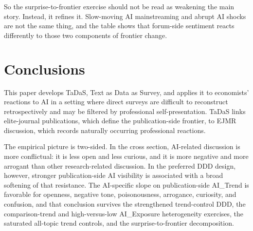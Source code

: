 \documentclass[11pt]{article}
\begin{document}
So the surprise-to-frontier exercise should not be read as weakening the main story. Instead, it refines it. Slow-moving AI mainstreaming and abrupt AI shocks are not the same thing, and the table shows that forum-side sentiment reacts differently to those two components of frontier change.

\begin{table}[!htbp]
    \centering
    \caption{Surprise-to-Frontier Decomposition: Preferred Full Specification}
    \label{tab:surprise_frontier_summary}
    \scriptsize
    \setlength{\tabcolsep}{4pt}
    \renewcommand{\arraystretch}{0.95}
    {\captionsetup{justification=raggedright,singlelinecheck=false}
    \caption*{\footnotesize Notes: Significance is based on year-clustered standard errors. * \(p<0.1\), ** \(p<0.05\), *** \(p<0.01\).}}
\end{table}

\FloatBarrier

\section{Conclusions}
\label{sec:conclusion}
This paper develops TaDaS, Text as Data as Survey, and applies it to economists' reactions to AI in a setting where direct surveys are difficult to reconstruct retrospectively and may be filtered by professional self-presentation. TaDaS links elite-journal publications, which define the publication-side frontier, to EJMR discussion, which records naturally occurring professional reactions.

The empirical picture is two-sided. In the cross section, AI-related discussion is more conflictual: it is less open and less curious, and it is more negative and more arrogant than other research-related discussion. In the preferred DDD design, however, stronger publication-side AI visibility is associated with a broad softening of that resistance. The AI-specific slope on publication-side AI\_Trend is favorable for openness, negative tone, poisonousness, arrogance, curiosity, and confusion, and that conclusion survives the strengthened trend-control DDD, the comparison-trend and high-versus-low AI\_Exposure heterogeneity exercises, the saturated all-topic trend controls, and the surprise-to-frontier decomposition.
\end{document}

